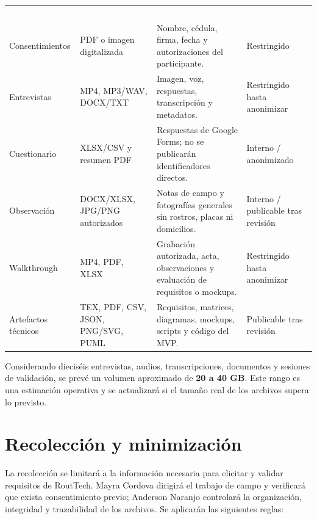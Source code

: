 \documentclass[10pt,a4paper]{article}
\begin{document}
\small
{}
\noindent\begin{tabularx}{\textwidth}{@{}L{2.55cm} L{3.0cm} J L{2.45cm}@{}}
\textcolor{white}{\textbf{Tipo}} &
\textcolor{white}{\textbf{Formato}} &
\textcolor{white}{\textbf{Contenido}} &
\textcolor{white}{\textbf{Clasificación}}\\
Consentimientos & PDF o imagen digitalizada & Nombre, cédula, firma, fecha y autorizaciones del participante. & Restringido\\
Entrevistas & MP4, MP3/WAV, DOCX/TXT & Imagen, voz, respuestas, transcripción y metadatos. & Restringido hasta anonimizar\\
Cuestionario & XLSX/CSV y resumen PDF & Respuestas de Google Forms; no se publicarán identificadores directos. & Interno / anonimizado\\
Observación & DOCX/XLSX, JPG/PNG autorizados & Notas de campo y fotografías generales sin rostros, placas ni domicilios. & Interno / publicable tras revisión\\
Walkthrough & MP4, PDF, XLSX & Grabación autorizada, acta, observaciones y evaluación de requisitos o mockups. & Restringido hasta anonimizar\\
Artefactos técnicos & TEX, PDF, CSV, JSON, PNG/SVG, PUML & Requisitos, matrices, diagramas, mockups, scripts y código del MVP. & Publicable tras revisión\\
\end{tabularx}
\normalsize

\begin{InfoBox}
Considerando dieciséis entrevistas, audios, transcripciones, documentos y sesiones de validación, se prevé un volumen aproximado de \textbf{20 a 40 GB}. Este rango es una estimación operativa y se actualizará si el tamaño real de los archivos supera lo previsto.
\end{InfoBox}

\section{Recolección y minimización}

La recolección se limitará a la información necesaria para elicitar y validar requisitos de RoutTech. Mayra Cordova dirigirá el trabajo de campo y verificará que exista consentimiento previo; Anderson Naranjo controlará la organización, integridad y trazabilidad de los archivos. Se aplicarán las siguientes reglas:
\end{document}
